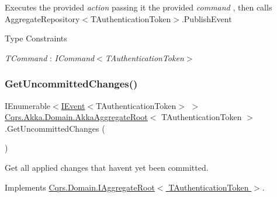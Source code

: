 Executes the provided {\itshape action}  passing it the provided {\itshape command} , then calls Aggregate\+Repository$<$\+T\+Authentication\+Token$>$.\+Publish\+Event 

\begin{Desc}
\item[Type Constraints]\begin{description}
\item[{\em T\+Command} : {\em I\+Command$<$T\+Authentication\+Token$>$}]\end{description}
\end{Desc}
\mbox{\label{classCqrs_1_1Akka_1_1Domain_1_1AkkaAggregateRoot_a2d11510fec0129ba318f63f7103aeec0_a2d11510fec0129ba318f63f7103aeec0}} 
\subsubsection{\texorpdfstring{Get\+Uncommitted\+Changes()}{GetUncommittedChanges()}}
{\footnotesize\ttfamily I\+Enumerable$<$\hyperlink{interfaceCqrs_1_1Events_1_1IEvent}{I\+Event}$<$T\+Authentication\+Token$>$ $>$ \hyperlink{classCqrs_1_1Akka_1_1Domain_1_1AkkaAggregateRoot}{Cqrs.\+Akka.\+Domain.\+Akka\+Aggregate\+Root}$<$ T\+Authentication\+Token $>$.Get\+Uncommitted\+Changes (\begin{DoxyParamCaption}{ }\end{DoxyParamCaption})}



Get all applied changes that haven\textquotesingle{}t yet been committed. 



Implements \hyperlink{interfaceCqrs_1_1Domain_1_1IAggregateRoot_a22fda414613f5ac0d4371554d7d6473b_a22fda414613f5ac0d4371554d7d6473b}{Cqrs.\+Domain.\+I\+Aggregate\+Root$<$ T\+Authentication\+Token $>$}.

\mbox{\label{classCqrs_1_1Akka_1_1Domain_1_1AkkaAggregateRoot_af6d84b07d4e9475bb88e769ac9081830_af6d84b07d4e9475bb88e769ac9081830}} 
